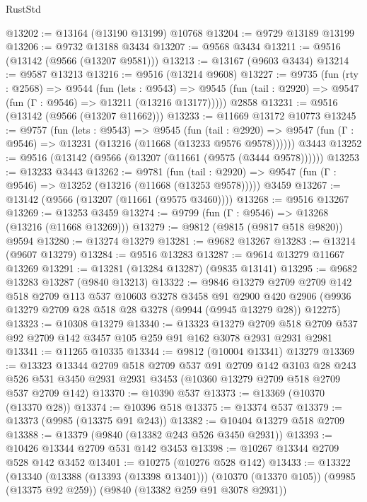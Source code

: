 \begin{lexlean}{RustStd}
\begin{coremodule}
@13202 := @13164 (@13190 @13199) @10768
@13204 := @9729 @13189 @13199
@13206 := @9732 @13188 @3434
@13207 := @9568 @3434
@13211 := @9516 (@13142 (@9566 (@13207 @9581)))
@13213 := @13167 (@9603 @3434)
@13214 := @9587 @13213
@13216 := @9516 (@13214 @9608)
@13227 := @9735
    (fun (rty : @2568) =>
    @9544
      (fun (lets : @9543) =>
      @9545 (fun (tail : @2920) => @9547 (fun (Γ : @9546) => @13211 (@13216 @13177)))))
    @2858
@13231 := @9516 (@13142 (@9566 (@13207 @11662)))
@13233 := @11669 @13172 @10773
@13245 := @9757
    (fun (lets : @9543) =>
    @9545
      (fun (tail : @2920) =>
      @9547 (fun (Γ : @9546) => @13231 (@13216 (@11668 (@13233 @9576 @9578))))))
    @3443
@13252 := @9516 (@13142 (@9566 (@13207 (@11661 (@9575 (@3444 @9578))))))
@13253 := @13233 @3443
@13262 := @9781
    (fun (tail : @2920) => @9547 (fun (Γ : @9546) => @13252 (@13216 (@11668 (@13253 @9578)))))
    @3459
@13267 := @13142 (@9566 (@13207 (@11661 (@9575 @3460))))
@13268 := @9516 @13267
@13269 := @13253 @3459
@13274 := @9799 (fun (Γ : @9546) => @13268 (@13216 (@11668 @13269)))
@13279 := @9812 (@9815 (@9817 @518 @9820)) @9594
@13280 := @13274 @13279
@13281 := @9682 @13267
@13283 := @13214 (@9607 @13279)
@13284 := @9516 @13283
@13287 := @9614 @13279 @11667 @13269
@13291 := @13281 (@13284 @13287) (@9835 @13141)
@13295 := @9682 @13283 @13287 (@9840 @13213)
@13322 := @9846
    @13279
    @2709
    @2709
    @142
    @518
    @2709
    @113
    @537
    @10603
    @3278
    @3458
    @91
    @2900
    @420
    @2906
    (@9936 @13279 @2709 @28 @518 @28 @3278 (@9944 (@9945 @13279 @28)) @12275)
@13323 := @10308 @13279
@13340 := @13323
    @13279
    @2709
    @518
    @2709
    @537
    @92
    @2709
    @142
    @3457
    @105
    @259
    @91
    @162
    @3078
    @2931
    @2931
    @2981
@13341 := @11265 @10335
@13344 := @9812 (@10004 @13341) @13279
@13369 := @13323
    @13344
    @2709
    @518
    @2709
    @537
    @91
    @2709
    @142
    @3103
    @28
    @243
    @526
    @531
    @3450
    @2931
    @2931
    @3453
    (@10360 @13279 @2709 @518 @2709 @537 @2709 @142)
@13370 := @10390 @537
@13373 := @13369 (@10370 (@13370 @28))
@13374 := @10396 @518
@13375 := @13374 @537
@13379 := @13373 (@9985 (@13375 @91 @243))
@13382 := @10404 @13279 @518 @2709
@13388 := @13379 (@9840 (@13382 @243 @526 @3450 @2931))
@13393 := @10426 @13344 @2709 @531 @142 @3453
@13398 := @10267 @13344 @2709 @528 @142 @3452
@13401 := @10275 (@10276 @528 @142)
@13433 := @13322
    (@13340
      (@13388 (@13393 (@13398 @13401)))
      (@10370 (@13370 @105))
      (@9985 (@13375 @92 @259))
      (@9840 (@13382 @259 @91 @3078 @2931))

\end{coremodule}
\end{lexlean}
